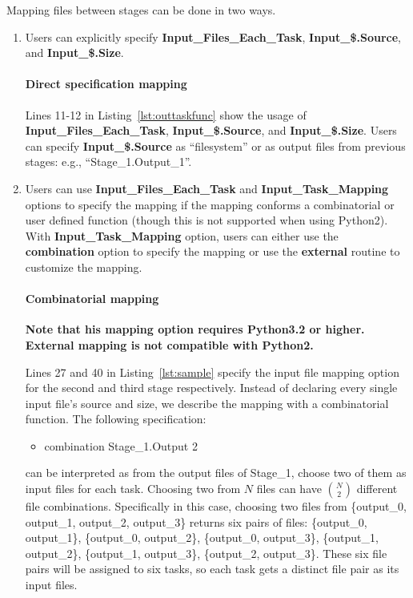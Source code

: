 \documentclass[10pt,a4paper]{article}
\begin{document}
Mapping files between stages can be done in two ways.

\begin{enumerate}
\item Users can explicitly specify \textbf{Input\_Files\_Each\_Task}, \textbf{Input\_\$.Source}, and \textbf{Input\_\$.Size}.

\paragraph{Direct specification mapping}

Lines 11-12 in Listing~\ref{lst:outtaskfunc} show the usage of \textbf{Input\_Files\_Each\_Task}, \textbf{Input\_\$.Source}, and \textbf{Input\_\$.Size}.
Users can specify \textbf{Input\_\$.Source} as ``filesystem'' or as output files from previous stages: e.g., ``Stage\_1.Output\_1''.

\item Users can use \textbf{Input\_Files\_Each\_Task} and \textbf{Input\_Task\_Mapping} options to specify the mapping if the mapping conforms a combinatorial or user defined function (though this is not supported when using Python2). 
With \textbf{Input\_Task\_Mapping} option, users can either use
the \textbf{combination} option to specify the mapping or use the \textbf{external} routine to customize the mapping. 


\paragraph{Combinatorial mapping}

\textbf{Note that his mapping option requires Python3.2 or higher. External mapping is not compatible with Python2.}

Lines 27 and 40 in Listing~\ref{lst:sample} specify the input file mapping option for the second and
third stage respectively. Instead of declaring every single input file's source and size, we describe
the mapping with a combinatorial function. The following specification:
\begin{itemize}
\item[] combination Stage\_1.Output 2
\end{itemize}
can be interpreted as from the output files of Stage\_1, choose two of them as input files for each task.
Choosing two from $N$ files can have $N \choose 2$ different file combinations. 
Specifically in this case, choosing two files from \{output\_0, output\_1, output\_2, output\_3\} returns six pairs of files: 
\{output\_0, output\_1\}, \{output\_0, output\_2\}, \{output\_0, output\_3\}, \{output\_1, output\_2\}, \{output\_1, output\_3\}, \{output\_2, output\_3\}.
These six file pairs will be assigned to six tasks, so each task gets a distinct file pair as its input files.


\end{enumerate}
\end{document}
